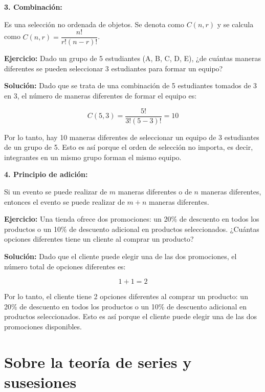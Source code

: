 \documentclass[11pt, a4paper]{article}
\begin{document}
\begin{multicols}{2}
    \begin{center}
      \textbf{3. Combinación:}
    \end{center}
    
    Es una selección no ordenada de objetos. Se denota como \( C(n, r) \) y se calcula como \( C(n, r) = \dfrac{n!}{r!(n - r)!} \).
    
    \textbf{Ejercicio:} Dado un grupo de 5 estudiantes (A, B, C, D, E), ¿de cuántas maneras diferentes se pueden seleccionar 3 estudiantes para formar un equipo?
    
    \textbf{Solución:} Dado que se trata de una combinación de 5 estudiantes tomados de 3 en 3, el número de maneras diferentes de formar el equipo es: 

    \[ C(5, 3) = \dfrac{5!}{3!(5 - 3)!} = 10 \]

    Por lo tanto, hay 10 maneras diferentes de seleccionar un equipo de 3 estudiantes de un grupo de 5. Esto es así porque el orden de selección no importa, es decir, integrantes en un mismo grupo forman el mismo equipo.

    \begin{center}
      \textbf{4. Principio de adición:}
    \end{center}
    
    Si un evento se puede realizar de \( m \) maneras diferentes o de \( n \) maneras diferentes, entonces el evento se puede realizar de \( m + n \) maneras diferentes.
    
    \textbf{Ejercicio:} Una tienda ofrece dos promociones: un 20\% de descuento en todos los productos o un 10\% de descuento adicional en productos seleccionados. ¿Cuántas opciones diferentes tiene un cliente al comprar un producto?
    
    \textbf{Solución:} Dado que el cliente puede elegir una de las dos promociones, el número total de opciones diferentes es: 

    \[ 1 + 1 = 2 \]

    Por lo tanto, el cliente tiene 2 opciones diferentes al comprar un producto: un 20\% de descuento en todos los productos o un 10\% de descuento adicional en productos seleccionados. Esto es así porque el cliente puede elegir una de las dos promociones disponibles.

  \end{multicols}

\newpage

\section{Sobre la teoría de series y susesiones}
\end{document}
